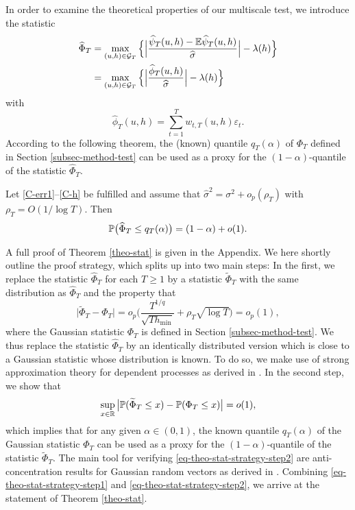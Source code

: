 In order to examine the theoretical properties of our multiscale test, we introduce the statistic 
\begin{align}
\widehat{\Phi}_T 
 & = \max_{(u,h) \in \mathcal{G}_T} \Big\{ \Big| \frac{\widehat{\psi}_T(u,h) - \mathbb{E} \widehat{\psi}_T(u,h)}{\widehat{\sigma}} \Big| - \lambda(h) \Big\} \nonumber \\
 & = \max_{(u,h) \in \mathcal{G}_T} \Big\{ \Big| \frac{\widehat{\phi}_T(u,h)}{\widehat{\sigma}} \Big| - \lambda(h) \Big\} \label{Phi-hat-statistic}
\end{align}
with 
\[ \widehat{\phi}_T(u,h) = \sum\limits_{t=1}^T w_{t,T}(u,h) \varepsilon_t. \]
According to the following theorem, the (known) quantile $q_T(\alpha)$ of $\Phi_T$ defined in Section \ref{subsec-method-test} can be used as a proxy for the $(1-\alpha)$-quantile of the statistic $\widehat{\Phi}_T$.
\begin{theorem}\label{theo-stat}
Let \ref{C-err1}--\ref{C-h} be fulfilled and assume that $\widehat{\sigma}^2 = \sigma^2 + o_p(\rho_T)$ with $\rho_T = O(1/\log T)$. Then 
\[ \mathbb{P} \big( \widehat{\Phi}_T \le q_T(\alpha) \big) = (1 - \alpha) + o(1). \]
\end{theorem}
A full proof of Theorem \ref{theo-stat} is given in the Appendix. 
We here shortly outline the proof strategy, which splits up into two main steps: In the first, we replace the statistic $\widehat{\Phi}_T$ for each $T \ge 1$ by a statistic $\widetilde{\Phi}_T$ with the same distribution as $\widehat{\Phi}_T$ and the property that 
\begin{equation}\label{eq-theo-stat-strategy-step1}
\big| \widetilde{\Phi}_T - \Phi_T \big| = o_p \Big( \frac{T^{1/q}}{\sqrt{T h_{\min}}} + \rho_T \sqrt{\log T} \Big) = o_p(1),
\end{equation}
where the Gaussian statistic $\Phi_T$ is defined in Section \ref{subsec-method-test}. We thus replace the statistic $\widehat{\Phi}_T$ by an identically distributed version which is close to a Gaussian statistic whose distribution is known. To do so, we make use of strong approximation theory for dependent processes as derived in \cite{BerkesLiuWu2014}. In the second step, we show that 
\begin{equation}\label{eq-theo-stat-strategy-step2}
\sup_{x \in \mathbb{R}} \big| \mathbb{P}(\widetilde{\Phi}_T \le x) - \mathbb{P}(\Phi_T \le x) \big| = o(1), 
\end{equation}
which implies that for any given $\alpha \in (0,1)$, the known quantile $q_T(\alpha)$ of the Gaussian statistic $\Phi_T$ can be used as a proxy for the $(1-\alpha)$-quantile of the statistic $\widetilde{\Phi}_T$. The main tool for verifying \eqref{eq-theo-stat-strategy-step2} are anti-concentration results for Gaussian random vectors as derived in \cite{Chernozhukov2015}. Combining \eqref{eq-theo-stat-strategy-step1} and \eqref{eq-theo-stat-strategy-step2}, we arrive at the statement of Theorem \ref{theo-stat}. 


